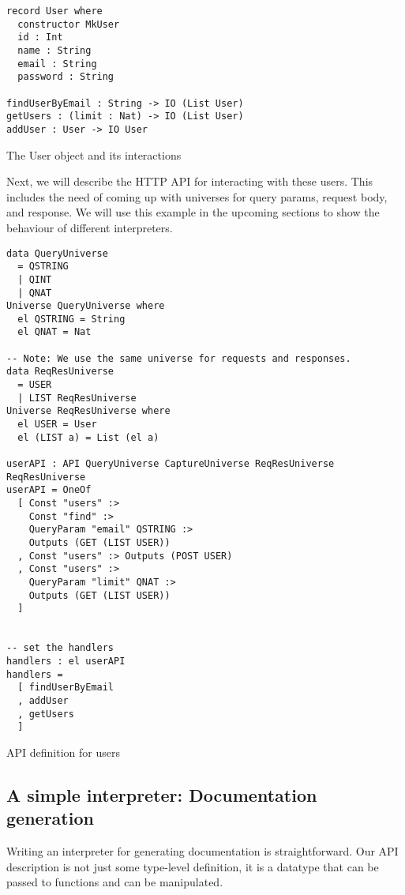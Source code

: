 \documentclass[12pt,a4paper]{article}
\begin{document}
\begin{listing}[H]
\begin{verbatim}
record User where
  constructor MkUser
  id : Int
  name : String
  email : String
  password : String

findUserByEmail : String -> IO (List User)
getUsers : (limit : Nat) -> IO (List User)
addUser : User -> IO User
\end{verbatim}
\label{code:domain}
\caption{The User object and its interactions}
\end{listing}

Next, we will describe the HTTP API for interacting with these users.  This includes
the need of coming up with universes for query params, request body, and response. We will use this example in the upcoming sections
to show the behaviour of different interpreters.

\begin{listing}[H]
\begin{verbatim}
data QueryUniverse
  = QSTRING
  | QINT
  | QNAT
Universe QueryUniverse where
  el QSTRING = String
  el QNAT = Nat

-- Note: We use the same universe for requests and responses.
data ReqResUniverse
  = USER
  | LIST ReqResUniverse
Universe ReqResUniverse where
  el USER = User
  el (LIST a) = List (el a)

userAPI : API QueryUniverse CaptureUniverse ReqResUniverse ReqResUniverse
userAPI = OneOf
  [ Const "users" :>
    Const "find" :>
    QueryParam "email" QSTRING :>
    Outputs (GET (LIST USER))
  , Const "users" :> Outputs (POST USER)
  , Const "users" :>
    QueryParam "limit" QNAT :>
    Outputs (GET (LIST USER))
  ]


-- set the handlers
handlers : el userAPI
handlers =
  [ findUserByEmail
  , addUser
  , getUsers
  ]

\end{verbatim}
\label{code:api}
\caption{API definition for users}
\end{listing}

\subsection{A simple interpreter: Documentation generation}
Writing an interpreter for generating documentation is straightforward. Our API description is not just some type-level definition, it is  a datatype that can be passed to functions and can be manipulated.
\end{document}
